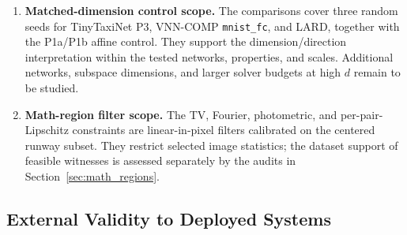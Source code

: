 \documentclass[twocolumn,smallextended,runningheads]{svjour3}
\begin{document}
\begin{enumerate}[nosep]
  \item \textbf{Matched-dimension control scope.} The comparisons cover three random seeds for TinyTaxiNet P3, VNN-COMP \texttt{mnist\_fc}, and LARD, together with the P1a/P1b affine control. They support the dimension/direction interpretation within the tested networks, properties, and scales. Additional networks, subspace dimensions, and larger solver budgets at high $d$ remain to be studied.
  \item \textbf{Math-region filter scope.} The TV, Fourier, photometric, and per-pair-Lipschitz constraints are linear-in-pixel filters calibrated on the centered runway subset. They restrict selected image statistics; the dataset support of feasible witnesses is assessed separately by the audits in Section~\ref{sec:math_regions}.
\end{enumerate}

\subsection{External Validity to Deployed Systems}
\end{document}
